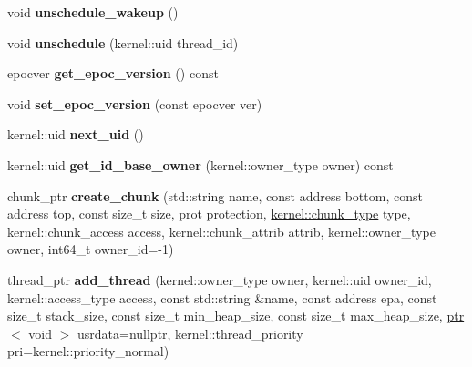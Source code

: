\begin{DoxyCompactItemize}
\mbox{\label{classeka2l1_1_1kernel__system_aa7398638174fab943ce3ed2fa5d603a0}} 
void {\bfseries unschedule\+\_\+wakeup} ()
\item 
\mbox{\label{classeka2l1_1_1kernel__system_af4631250187bda7d12dd0f77f4265469}} 
void {\bfseries unschedule} (kernel\+::uid thread\+\_\+id)
\item 
\mbox{\label{classeka2l1_1_1kernel__system_a9c4c3f51e186d1bf0ed96d76846b8971}} 
epocver {\bfseries get\+\_\+epoc\+\_\+version} () const
\item 
\mbox{\label{classeka2l1_1_1kernel__system_a1c34f1d2a43f6d8f6c331fc3020b7b93}} 
void {\bfseries set\+\_\+epoc\+\_\+version} (const epocver ver)
\item 
\mbox{\label{classeka2l1_1_1kernel__system_a33ac52af32d08cfb42a4b8db2702aecf}} 
kernel\+::uid {\bfseries next\+\_\+uid} ()
\item 
\mbox{\label{classeka2l1_1_1kernel__system_a0ba1d26f07c209a32f9f5361fc1ed42b}} 
kernel\+::uid {\bfseries get\+\_\+id\+\_\+base\+\_\+owner} (kernel\+::owner\+\_\+type owner) const
\item 
\mbox{\label{classeka2l1_1_1kernel__system_a19961f1ed8b11ab1b08d07bef8975da6}} 
chunk\+\_\+ptr {\bfseries create\+\_\+chunk} (std\+::string name, const address bottom, const address top, const size\+\_\+t size, prot protection, \mbox{\hyperlink{namespaceeka2l1_1_1kernel_aee9c57d72d8825de61cb11d4396438ed}{kernel\+::chunk\+\_\+type}} type, kernel\+::chunk\+\_\+access access, kernel\+::chunk\+\_\+attrib attrib, kernel\+::owner\+\_\+type owner, int64\+\_\+t owner\+\_\+id=-\/1)
\item 
\mbox{\label{classeka2l1_1_1kernel__system_a16169c6a0346ce7548baf4d8114a56e1}} 
thread\+\_\+ptr {\bfseries add\+\_\+thread} (kernel\+::owner\+\_\+type owner, kernel\+::uid owner\+\_\+id, kernel\+::access\+\_\+type access, const std\+::string \&name, const address epa, const size\+\_\+t stack\+\_\+size, const size\+\_\+t min\+\_\+heap\+\_\+size, const size\+\_\+t max\+\_\+heap\+\_\+size, \mbox{\hyperlink{classeka2l1_1_1ptr}{ptr}}$<$ void $>$ usrdata=nullptr, kernel\+::thread\+\_\+priority pri=kernel\+::priority\+\_\+normal)

\end{DoxyCompactItemize}

